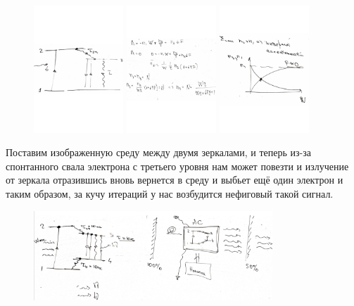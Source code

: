 \begin{figure}[htb]
    \centering
    \includegraphics[width=0.3\textwidth]{img/2cxema.pdf}
     \includegraphics[width=0.3\textwidth]{img/len_texat2.pdf}
    \includegraphics[width=0.3\textwidth]{img/inv_nas.pdf}
\end{figure}



Поставим изображенную среду между двумя зеркалами, и теперь из-за спонтанного свала электрона с третьего уровня нам может повезти и излучение от зеркала отразившись вновь вернется в среду и выбьет ещё один электрон и таким образом, за кучу итераций у нас возбудится нефиговый такой сигнал.
\begin{figure}[b]
    \centering
    \includegraphics[width=0.8\textwidth]{img/3cxema.png}
\end{figure}

